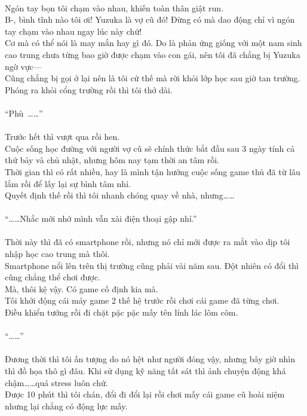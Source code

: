 \documentclass[12pt,a4paper, twosides]{book}
\begin{document}
\\
Ngón tay bọn tôi chạm vào nhau, khiến toàn thân giật run.\\
B-, bình tĩnh nào tôi ơi! Yuzuka là vợ cũ đó! Đừng có mà dao động chỉ vì ngón tay chạm vào nhau ngay lúc này chứ!\\
Cơ mà có thể nói là may mắn hay gì đó. Do là phản ứng giống với một nam sinh cao trung chưa từng bao giờ được chạm vào con gái, nên tôi đã chẳng bị Yuzuka ngờ vực—\\
Cũng chẳng bị gọi ở lại nên là tôi cứ thế mà rời khỏi lớp học sau giờ tan trường.\\
Phóng ra khỏi cổng trường rồi thì tôi thở dài.\\
\\
“Phù~……”\\
\\
Trước hết thì vượt qua rồi hen.\\
Cuộc sống học đường với người vợ cũ sẽ chính thức bắt đầu sau 3 ngày tính cả thứ bảy và chủ nhật, nhưng hôm nay tạm thời an tâm rồi.\\
Thời gian thì có rất nhiều, hay là mình tận hưởng cuộc sống game thủ đã từ lâu lắm rồi để lấy lại sự bình tâm nhỉ.\\
Quyết định thế rồi thì tôi nhanh chóng quay về nhà, nhưng……\\
\\
“……Nhắc mới nhớ mình vẫn xài điện thoại gập nhỉ.”\\
\\
Thời này thì đã có smartphone rồi, nhưng nó chỉ mới được ra mắt vào dịp tôi nhập học cao trung mà thôi.\\
Smartphone nổi lên trên thị trường cũng phải vài năm sau. Đột nhiên có đổi thì cũng chẳng thể chơi được.\\
Mà, thôi kệ vậy. Có game cố định kia mà.\\
Tôi khởi động cái máy game 2 thế hệ trước rồi chơi cái game đã từng chơi.\\
Điều khiển tướng rồi đi chặt pặc pặc mấy tên lính lác lôm côm.\\
\\
“……”\\
\\
Đương thời thì tôi ấn tượng do nó hệt như người đóng vậy, nhưng bây giờ nhìn thì đồ họa thô gì đâu. Khi sử dụng kỹ năng tất sát thì ảnh chuyện động khá chậm……quá stress luôn chứ.\\
Được 10 phút thì tôi chán, đổi đi đổi lại rồi chơi mấy cái game cũ hoài niệm nhưng lại chẳng có động lực mấy.\\
\end{document}
